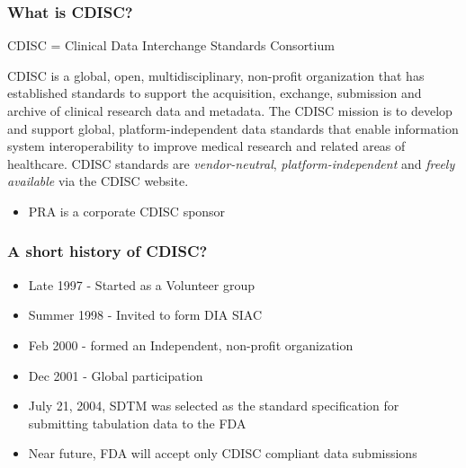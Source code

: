 \documentclass{beamer}
\begin{document}
\begin{frame}
  \frametitle{What is CDISC?}
  \alert{CDISC} = Clinical Data Interchange Standards Consortium
  
	\begin{definition}
	\alert{CDISC} is a global, open, multidisciplinary, non-profit organization that has established standards to support the acquisition, exchange, submission and archive of clinical research data and metadata. The CDISC mission is to develop and support global, platform-independent data standards that enable information system interoperability to improve medical research and related areas of healthcare.  CDISC standards are \emph{vendor-neutral}, \emph{platform-independent} and \emph{freely available} via the CDISC website. 
	\end{definition}
  
  \begin{itemize}
		\item PRA is a corporate CDISC sponsor
  \end{itemize}
\end{frame}
  

\begin{frame}
  \frametitle{A short history of CDISC?}
  \begin{itemize}
		\item Late 1997 - Started as a Volunteer group 
		\item Summer 1998 - Invited to form DIA SIAC 
		\item Feb 2000 - formed an Independent, non-profit organization 
		\item Dec 2001 - Global participation 
		\item July 21, 2004, SDTM was selected as the standard specification for submitting tabulation data to the
		 FDA
		\item Near future, FDA will accept only CDISC compliant data submissions
  \end{itemize}
\end{frame}
\end{document}
